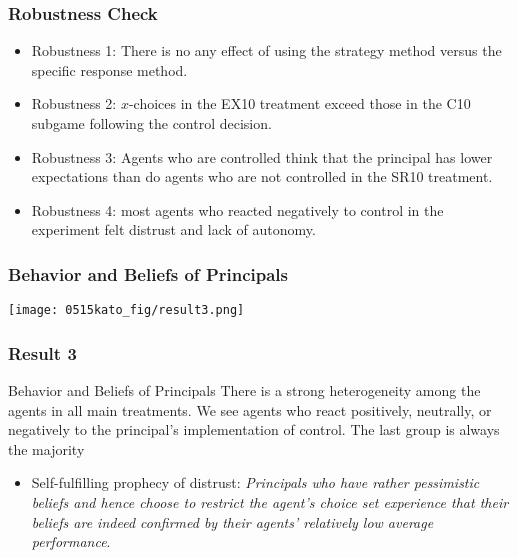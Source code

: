 \documentclass[unicode,12pt]{beamer}
\begin{document}
    \begin{frame}
        \frametitle{Robustness Check}
    
        \begin{itemize}
            \item Robustness 1: There is no any effect of using the strategy method versus the specific response method.
            \item Robustness 2: $x$-choices in the EX10 treatment exceed those in the C10 subgame following the control decision.
            \item Robustness 3: Agents who are controlled think that the principal has lower expectations than do agents who are not controlled in the SR10 treatment.
            \item Robustness 4: most agents who reacted negatively to control in the experiment felt distrust and lack of autonomy.
        \end{itemize}
    
    \end{frame}

    \begin{frame}
        \frametitle{Behavior and Beliefs of Principals}
    
        \centerline{\texttt{[image: 0515kato\_fig/result3.png]}}
    
    \end{frame}

    \begin{frame}
        \frametitle{Result 3}

        \begin{block}{Behavior and Beliefs of Principals}
            There is a strong heterogeneity among the agents in all main treatments. We see agents who react positively, neutrally, or negatively to the principal's implementation of control. The last group is always the majority
        \end{block}
        \begin{itemize}
            \item Self-fulfilling prophecy of distrust: \textit{Principals who have rather pessimistic beliefs and hence choose to restrict the agent's choice set experience that their beliefs are indeed confirmed by their agents' relatively low average performance}.
        \end{itemize}
    
    \end{frame}
\end{document}
